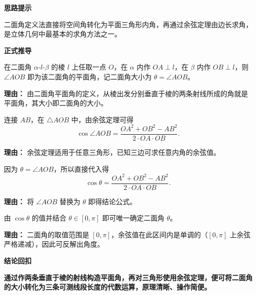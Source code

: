 \begin{proofbox}
	\textbf{\textcolor{CProof}{思路提示}}

	二面角定义法直接将空间角转化为平面三角形内角，再通过余弦定理由边长求角，是立体几何中最基本的求角方法之一。

	\medskip
	\textbf{\textcolor{CProof}{正式推导}}
	\begin{description}[style=nextline, leftmargin=2.8em, labelsep=0.5em, itemsep=0.55em]
		\item[\textbf{步骤一（构造平面角）：}] 在二面角 $\alpha\text{-}l\text{-}\beta$ 的棱 $l$ 上任取一点 $O$，在 $\alpha$ 内作 $OA\perp l$，在 $\beta$ 内作 $OB\perp l$，则 $\angle AOB$ 即为该二面角的平面角，记二面角大小为 $\theta = \angle AOB$。
			\par\textbf{理由：}
			由二面角平面角的定义，从棱出发分别垂直于棱的两条射线所成的角就是平面角，其大小即二面角的大小。

		\item[\textbf{步骤二（运用余弦定理）：}] 连接 $AB$，在 $\triangle AOB$ 中，由余弦定理可得
			\[
				\cos\angle AOB = \frac{OA^2 + OB^2 - AB^2}{2\cdot OA \cdot OB}.
			\]
			\par\textbf{理由：}
			余弦定理适用于任意三角形，已知三边可求任意内角的余弦值。

		\item[\textbf{步骤三（回代定义）：}] 因为 $\theta = \angle AOB$，所以直接代入得
			\[
				\cos\theta = \frac{OA^2 + OB^2 - AB^2}{2\cdot OA \cdot OB}.
			\]
			\par\textbf{理由：}
			将 $\angle AOB$ 替换为 $\theta$ 即得结论公式。

		\item[\textbf{步骤四（确定角大小）：}] 由 $\cos\theta$ 的值并结合 $\theta\in[0,\pi]$ 即可唯一确定二面角 $\theta$。
			\par\textbf{理由：}
			二面角的取值范围是 $[0,\pi]$，余弦值在此区间内是单调的（$[0,\pi]$ 上余弦严格递减），因此可反解出角度。
	\end{description}

	\medskip
	\textbf{\textcolor{CProof}{结论回扣}}

	\textbf{通过作两条垂直于棱的射线构造平面角，再对三角形使用余弦定理，便可将二面角的大小转化为三条可测线段长度的代数运算，原理清晰、操作简便。}
\end{proofbox}
